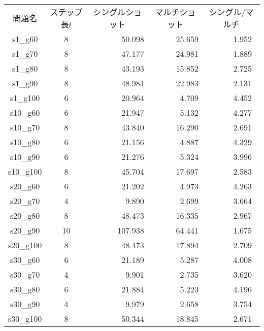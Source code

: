 \begin{tabular}{ccrrr}  
 \rowcolor[RGB]{0,96,0}
  \color{white}問題名 &
  \multicolumn{1}{c}{\color{white}ステップ長$t$} & 
  \multicolumn{1}{c}{\color{white}シングルショット} & 
  \multicolumn{1}{c}{\color{white}マルチショット} & 
  \multicolumn{1}{c}{\color{white}シングル/マルチ} \\
 \rowcolor[RGB]{230,239,230}%
s1\_g60 & 8 & 50.098 & \alert{25.659} & 1.952~ \\
 \rowcolor[RGB]{196,230,196}%
s1\_g70 & 8 & 47.177 & \alert{24.981} & 1.889~ \\
 \rowcolor[RGB]{230,239,230}%
s1\_g80 & 8 & 43.193 & \alert{15.852} & 2.725~ \\
 \rowcolor[RGB]{196,230,196}%
s1\_g90 & 8 & 48.984 & \alert{22.983} & 2.131~ \\
 \rowcolor[RGB]{230,239,230}%
s1\_g100 & 6 & 20.964 & \alert{4.709} & 4.452~ \\
 \rowcolor[RGB]{196,230,196}%
s10\_g60 & 6 & 21.947 & \alert{5.132} & 4.277~ \\
 \rowcolor[RGB]{230,239,230}%
s10\_g70 & 8 & 43.840 & \alert{16.290} & 2.691~ \\
 \rowcolor[RGB]{196,230,196}%
s10\_g80 & 6 & 21.156 & \alert{4.887} & 4.329~ \\
 \rowcolor[RGB]{230,239,230}%
s10\_g90 & 6 & 21.276 & \alert{5.324} & 3.996~ \\
 \rowcolor[RGB]{196,230,196}%
s10\_g100 & 8 & 45.704 & \alert{17.697} & 2.583~ \\
 \rowcolor[RGB]{230,239,230}%
s20\_g60 & 6 & 21.202 & \alert{4.973} & 4.263~ \\
 \rowcolor[RGB]{196,230,196}%
s20\_g70 & 4 & 9.890 & \alert{2.699} & 3.664~ \\
 \rowcolor[RGB]{230,239,230}%
s20\_g80 & 8 & 48.473 & \alert{16.335} & 2.967~ \\
 \rowcolor[RGB]{196,230,196}%
s20\_g90 & 10 & 107.938 & \alert{64.441} & 1.675~ \\
 \rowcolor[RGB]{230,239,230}%
s20\_g100 & 8 & 48.473 & \alert{17.894} & 2.709~ \\
 \rowcolor[RGB]{196,230,196}%
s30\_g60 & 6 & 21.189 & \alert{5.287} & 4.008~ \\
 \rowcolor[RGB]{230,239,230}%
s30\_g70 & 4 & 9.901 & \alert{2.735} & 3.620~ \\
 \rowcolor[RGB]{196,230,196}%
s30\_g80 & 6 & 21.884 & \alert{5.223} & 4.196~ \\
 \rowcolor[RGB]{230,239,230}%
s30\_g90 & 4 & 9.979 & \alert{2.658} & 3.754~ \\
 \rowcolor[RGB]{196,230,196}%
s30\_g100 & 8 & 50.344 & \alert{18.845} & 2.671~ \\
\end{tabular}
